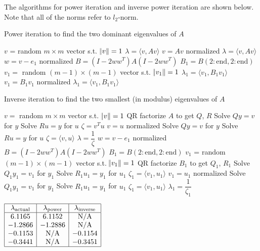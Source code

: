 \documentclass[11pt]{article}
\begin{document}
\section{}
The algorithms for power iteration and inverse power iteration are shown below. Note that all of the norms refer to $l_2$-norm.
\begin{algorithm}[H]
\caption{Power iteration to find the two dominant eigenvalues of $A$}
\begin{algorithmic}
	\STATE $v$ = random $m\times m$ vector s.t. $\norm{v} = 1$
	\STATE $\lambda = \langle v,Av\rangle$
		\STATE $v=Av$ normalized
		\STATE $\lambda = \langle v,Av\rangle$
	\ENDWHILE
	\STATE $w=v-e_1$ normalized
	\STATE $B = (I-2ww^T)A(I-2ww^T)$
	\STATE $B_1 = B(2:\text{end}, 2:\text{end})$
	\STATE $v_1=$ random $(m-1)\times(m-1)$ vector s.t. $\norm{v_1} = 1$
	\STATE $\lambda_1 = \langle v_1,B_1v_1\rangle$
		\STATE $v_1 = B_1v_1$ normalized
		\STATE $\lambda_1 = \langle v_1,B_1v_1\rangle$
	\ENDWHILE
\end{algorithmic}
\end{algorithm}
\begin{algorithm}[H]
\caption{Inverse iteration to find the two smallest (in modulus) eigenvalues of $A$}
\begin{algorithmic}
	\STATE $v=$ random $m\times m$ vector s.t. $\norm{v} = 1$
	\STATE QR factorize $A$ to get $Q$, $R$
	\STATE Solve $Qy=v$ for $y$
	\STATE Solve $Ru=y$ for $u$
	\STATE $\zeta=v^Tu$
		\STATE $v = u$ normalized
		\STATE Solve $Qy=v$ for $y$
		\STATE Solve $Ru=y$ for $u$
		\STATE $\zeta = \langle v,u\rangle$
	\ENDWHILE
	\STATE $\lambda=\dfrac1{\zeta}$
	\STATE $w=v-e_1$ normalized
	\STATE $B = (I-2ww^T)A(I-2ww^T)$
	\STATE $B_1 = B(2:\text{end}, 2:\text{end})$
	\STATE $v_1$ = random $(m-1)\times(m-1)$ vector s.t. $\norm{v_1}=1$
	\STATE QR factorize $B_1$ to get $Q_1$, $R_1$
	\STATE Solve $Q_1y_1=v_1$ for $y_1$
	\STATE Solve $R_1u_1=y_1$ for $u_1$
	\STATE $\zeta_1=\langle v_1,u_1\rangle$
		\STATE $v_1=u_1$ normalized
		\STATE Solve $Q_1y_1=v_1$ for $y_1$
		\STATE Solve $R_1u_1=y_1$ for $u_1$
		\STATE $\zeta_1=\langle v_1,u_1\rangle$ 
	\ENDWHILE
	\STATE $\lambda_1=\dfrac1{\zeta_1}$
\end{algorithmic}
\end{algorithm}
\begin{center}
$\begin{array}{|c|c|c|}
\hline
\lambda_{\text{actual}} & \lambda_{\text{power}} & \lambda_{\text{inverse}} \\
\hline
6.1165 & 6.1152 & \text{N/A}\\
-1.2866 & -1.2886 & \text{N/A}\\
-0.1153 & \text{N/A} & -0.1154 \\
-0.3441 & \text{N/A} & -0.3451\\
\hline
\end{array}$
\end{center}
\end{document}
